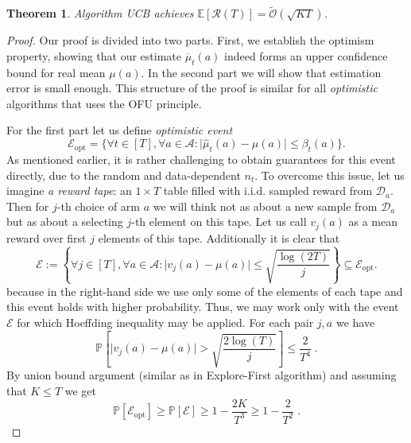 \documentclass{article}
\numberwithin{equation}{section}
\newtheorem{theorem}{Theorem}
\newcommand{\E}{\mathbb E}
\newcommand{\cA}{\mathcal{A}}
\newcommand{\cD}{\mathcal{D}}
\newcommand{\cE}{\mathcal{E}}
\newcommand{\eqsp}{\;}
\begin{document}
\begin{theorem}
    Algorithm UCB achieves $\E[\mathcal{R}(T)] = \widetilde{\mathcal{O}}(\sqrt{KT})$.
\end{theorem}
\begin{proof}
    Our proof is divided into two parts. First, we establish the optimism property, showing that our estimate $\overline{\mu}_t(a)$ indeed forms an upper confidence bound for real mean $\mu(a)$. In the second part we will show that estimation error is small enough. This structure of the proof is similar for all \textit{optimistic} algorithms that uses the OFU principle.
    
    For the first part let us define \textit{optimistic event}
    \[
        \cE_{\text{opt}} = \{ \forall t \in [T], \forall a \in \cA : \vert \widehat{\mu}_t(a) - \mu(a)\vert \leq \beta_t(a) \}.
    \]
   As mentioned earlier, it is rather challenging to obtain guarantees for this event directly, due to the random and data-dependent \(n_t\). To overcome this issue, let us imagine \textit{a reward tape}: an $1 \times T$ table filled with i.i.d. sampled reward from $\cD_a$. Then for $j$-th choice of arm $a$ we will think not as about a new sample from $\cD_a$ but as about a selecting $j$-th element on this tape. Let us call $v_j(a)$ as a mean reward over first $j$ elements of this tape. Additionally it is clear that
    \[
        \cE := \left\{ \forall j \in [T], \forall a \in \cA : \vert v_j(a) - \mu(a)\vert \leq \sqrt{\frac{\log(2T)}{j}} \right\} \subseteq \cE_{\text{opt}}  .
    \]
    because in the right-hand side we use only some of the elements of each tape and this event holds with higher probability. Thus, we may work only with the event $\cE$ for which Hoeffding inequality may be applied. For each pair $j,a$ we have
    \[
        \mathbb{P}\left[\vert v_j(a) - \mu(a)\vert > \sqrt{\frac{2\log(T)}{j}} \right]  \leq \frac{2}{T^4}\eqsp.
    \]
    By union bound argument (similar as in Explore-First algorithm) and assuming that $K \leq T$ we get
    \[
        \mathbb{P}[\cE_{\text{opt}}] \geq \mathbb{P}[\cE] \geq 1 - \frac{2K}{T^3} \geq 1 - \frac{2}{T^2}\eqsp.
    \]
    

\end{proof}
\end{document}
